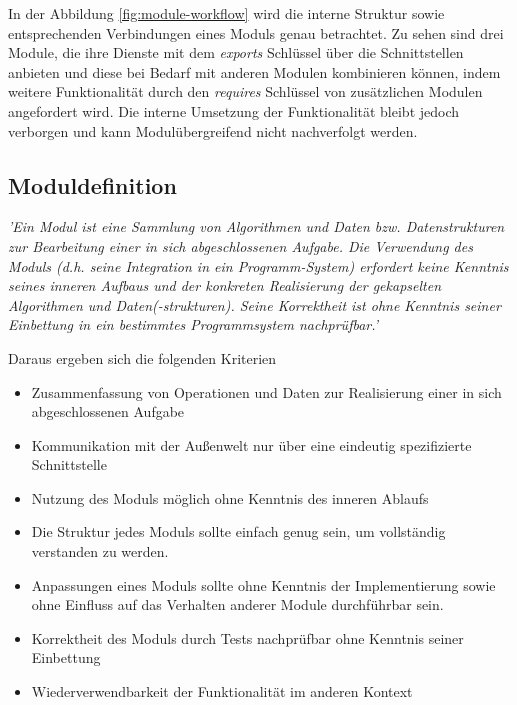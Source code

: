     \newline In der Abbildung \ref{fig:module-workflow} wird die interne Struktur sowie entsprechenden Verbindungen eines Moduls genau betrachtet. Zu sehen sind drei Module, die ihre Dienste mit dem \textit{exports} Schlüssel über die Schnittstellen anbieten und diese bei Bedarf mit anderen Modulen kombinieren können, indem weitere Funktionalität durch den \textit{requires} Schlüssel von zusätzlichen Modulen angefordert wird. Die interne Umsetzung der Funktionalität bleibt jedoch verborgen und kann Modulübergreifend nicht nachverfolgt werden. 

  \subsection{Moduldefinition}

\begin{displayquote}
	\textit {'Ein Modul ist eine Sammlung von Algorithmen und Daten bzw. Datenstrukturen zur Bearbeitung einer in sich abgeschlossenen Aufgabe. Die Verwendung des Moduls (d.h. seine Integration in ein Programm-System) erfordert keine Kenntnis seines inneren Aufbaus und der konkreten Realisierung der gekapselten Algorithmen und Daten(-strukturen). Seine Korrektheit ist ohne Kenntnis seiner Einbettung in ein bestimmtes Programmsystem nachprüfbar.'}
\end{displayquote}

Daraus ergeben sich die folgenden Kriterien

\begin{itemize}
  \item Zusammenfassung von Operationen und Daten zur Realisierung einer in sich abgeschlossenen Aufgabe 
  \item Kommunikation mit der Außenwelt nur über eine eindeutig spezifizierte Schnittstelle 
  \item Nutzung des Moduls möglich ohne Kenntnis des inneren Ablaufs 
  \item Die Struktur jedes Moduls sollte einfach genug sein, um vollständig verstanden zu werden.
  \item Anpassungen eines Moduls sollte ohne Kenntnis der Implementierung sowie ohne Einfluss auf das Verhalten anderer Module durchführbar sein.
  \item Korrektheit des Moduls durch Tests nachprüfbar ohne Kenntnis seiner Einbettung
  \item Wiederverwendbarkeit der Funktionalität im anderen Kontext
\end{itemize}

